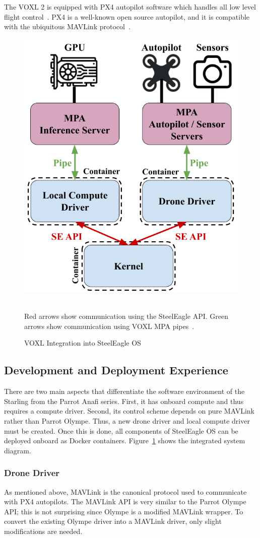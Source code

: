 The VOXL 2 is equipped with PX4 autopilot software which handles all low level flight control~\cite{PX4}. PX4 is a well-known open source autopilot, and it is compatible with the ubiquitous MAVLink protocol~\cite{MAVLink}.

\begin{figure}
    \centering
    \includegraphics[width=0.4\linewidth]{chapter7/FIGS/voxl-integration.png}
    \begin{captext}
        \\[0.1cm] \small Red arrows show communication using the SteelEagle API. Green arrows show communication using VOXL MPA pipes~\cite{VOXLSDK}.
    \end{captext}
    \caption{VOXL Integration into SteelEagle OS}
    \label{fig:voxl-integration}
\end{figure}

\subsection{Development and Deployment Experience}
There are two main aspects that differentiate the software environment of the Starling from the Parrot Anafi series. First, it has onboard compute and thus requires a compute driver. Second, its control scheme depends on pure MAVLink rather than Parrot Olympe. Thus, a new drone driver and local compute driver must be created. Once this is done, all components of SteelEagle OS can be deployed onboard as Docker containers. Figure~\ref{fig:voxl-integration} shows the integrated system diagram.

\subsubsection{Drone Driver}
As mentioned above, MAVLink is the canonical protocol used to communicate with PX4 autopilots. The MAVLink API is very similar to the Parrot Olympe API; this is not surprising since Olympe is a modified MAVLink wrapper. To convert the existing Olympe driver into a MAVLink driver, only slight modifications are needed.

